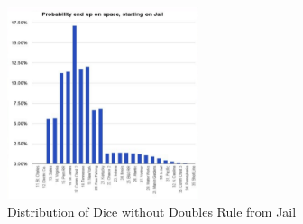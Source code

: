 \documentclass[12pt]{article}
\begin{document}
\begin{figure}[h]
\centering
\includegraphics[width=0.5\textwidth]{incl_doubles_jail.png}
\caption{Distribution of Dice without Doubles Rule from Jail}
\end{figure}
\end{document}
